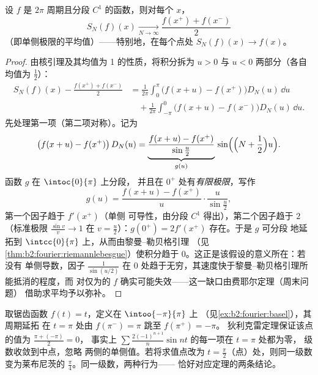\begin{theorem}[狄利克雷]\label{thm:b2:fourier:dirichlet}
设 $f$ 是 $2\pi$ 周期且分段 $C^1$ 的函数，则对每个 $x$，
\[
S_N(f)(x) \xrightarrow[N \to \infty]{}
\frac{f(x^+) + f(x^-)}{2}
\]
（即单侧极限的平均值）——特别地，在每个点处 $S_N(f)(x) \to
f(x)$。
\end{theorem}


\begin{proof}
由核引理及其均值为 1 的性质，将积分拆为
$u > 0$ 与 $u < 0$ 两部分（各自均值为 $\frac12$）：
\begin{align*}
S_N(f)(x) - \frac{f(x^+) + f(x^-)}{2}
&= \frac{1}{2\pi}\int_{0}^{\pi} \bigl(f(x+u) -
f(x^+)\bigr)D_N(u)\,\dd u\\
&\quad+ \frac{1}{2\pi}\int_{-\pi}^{0}\bigl(f(x+u) -
f(x^-)\bigr)D_N(u)\,\dd u .
\end{align*}
先处理第一项（第二项对称）。记为
\[
\bigl(f(x + u) - f(x^+)\bigr)\,D_N(u)
= \underbrace{\frac{f(x+u) - f(x^+)}{\sin\frac u2}}_{g(u)}\,
\sin\Bigl(\Bigl(N + \frac12\Bigr)u\Bigr) .
\]
函数 $g$ 在 $\intoc{0}{\pi}$ 上分段，
并且在 $0^+$ 处有\emph{有限极限}，写作
\[
g(u) = \frac{f(x+u) - f(x^+)}{u}\cdot\frac{u}{\sin\frac u2} ,
\]
第一个因子趋于 $f'(x^+)$（单侧
可导性，由分段 $C^1$ 得出），第二个因子趋于 $2$
（标准极限 $\frac{\sin v}{v} \to 1$ 在 $v = \frac
u2$）：$g(0^+) = 2f'(x^+)$ 存在。于是 $g$ 可分段
地延拓到 $\intcc{0}{\pi}$ 上，从而由黎曼–勒贝格引理
（见\cref{thm:b2:fourier:riemannlebesgue}）使积分趋于
$0$。这正是该假设的意义所在：若没有
单侧导数，因子 $\frac{1}{\sin(u/2)}$ 在
$0$ 处趋于无穷，其速度快于黎曼–勒贝格引理所能抵消的程度，而
对仅为的
$f$ 确实可能失效——这一缺口由费耶尔定理（周末问题）
借助求平均予以弥补。
\end{proof}

\begin{example}[狄利克雷在跳跃点处的值]\label{ex:b2:fourier:jumpvalue}
取锯齿函数 $f(t) = t$，定义在 $\intoo{-\pi}{\pi}$ 上
（见\cref{ex:b2:fourier:basel}），其周期延拓
在 $t = \pi$ 处由 $f(\pi^-) = \pi$ 跳至 $f(\pi^+) = -\pi$。
狄利克雷定理保证该点的值为 $\frac{\pi + (-\pi)}{2} = 0$，
事实上 $\sum
\frac{2(-1)^{n+1}}{n}\sin nt$ 的每一项在 $t = \pi$ 处都为零，
级数收敛到中点，忽略
两侧的单侧值。若将求值点改为 $t =
\frac\pi2$（点）处，则同一级数
变为莱布尼茨的 $\frac\pi4$。同一级数，两种行为——
恰好对应定理的两条结论。
\end{example}

